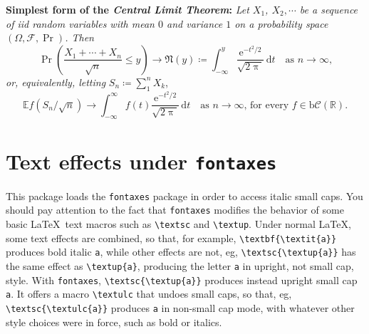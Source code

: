 \documentclass{article}
\begin{document}
\textbf{Simplest form of the \textit{Central Limit Theorem}:} \textit{Let
$X_1$, $X_2,\cdots$ be a sequence of iid random variables with mean $0$ 
and variance $1$ on a probability space $(\Omega,\mathcal{F},\Pr)$. Then}
\[\Pr\left(\frac{X_1+\cdots+X_n}{\sqrt{n}}\le y\right)\to\mathfrak{N}(y)\coloneq
\int_{-\infty}^y \frac{\mathrm{e}^{-t^2/2}}{\sqrt{2\uppi}}\,
\mathrm{d}t\quad\mbox{as $n\to\infty$,}\]
\textit{or, equivalently, letting} $S_n\coloneq\sum_1^n X_k$,
\[\mathbb{E} f(S_n/\sqrt{n})\to \int_{-\infty}^\infty f(t)
\frac{\mathrm{e}^{-t^2/2}}{\sqrt{2\uppi}}\,\mathrm{d}t
\quad\mbox{as $n\to\infty$, for every $f\in\mathrm{b}
\mathcal{C}(\mathbb{R})$.}\]

\section{Text effects under \texttt{fontaxes}}
This package loads the {\tt fontaxes} package in order to access italic small caps. You should pay attention to the fact that {\tt fontaxes} modifies the behavior of some basic \LaTeX\ text macros such as \verb|\textsc| and \verb|\textup|. Under normal \LaTeX, some text effects are combined, so that, for example, \verb|\textbf{\textit{a}}| produces bold italic {\tt a}, while other effects are not, eg, \verb|\textsc{\textup{a}}| has the same effect as \verb|\textup{a}|, producing the letter {\tt a} in upright, not small cap, style. With {\tt fontaxes}, \verb|\textsc{\textup{a}}| produces instead upright small cap {\tt a}. It offers a macro \verb|\textulc| that undoes small caps, so that, eg, \verb|\textsc{\textulc{a}}| produces {\tt a} in non-small cap mode, with whatever other style choices were in force, such as bold or italics.

\end{document}
